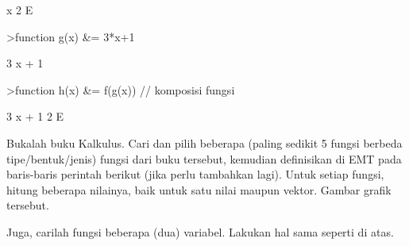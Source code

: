 \documentclass[a4paper,10pt]{article}
\begin{document}
\begin{eulernotebook}
\begin{euleroutput}
                                      x
                                   2 E
  
\end{euleroutput}
\begin{eulerprompt}
>function g(x) &= 3*x+1
\end{eulerprompt}
\begin{euleroutput}
  
                                 3 x + 1
  
\end{euleroutput}
\begin{eulerprompt}
>function h(x) &= f(g(x)) // komposisi fungsi
\end{eulerprompt}
\begin{euleroutput}
  
                                   3 x + 1
                                2 E
  
\end{euleroutput}
\begin{eulercomment}
Bukalah buku Kalkulus. Cari dan pilih beberapa (paling sedikit 5
fungsi berbeda tipe/bentuk/jenis) fungsi dari buku tersebut, kemudian
definisikan di EMT pada baris-baris perintah berikut (jika perlu
tambahkan lagi). Untuk setiap fungsi, hitung beberapa nilainya, baik
untuk satu nilai maupun vektor. Gambar grafik tersebut.

Juga, carilah fungsi beberapa (dua) variabel. Lakukan hal sama seperti
di atas.


\end{eulercomment}
\end{eulernotebook}
\end{document}
